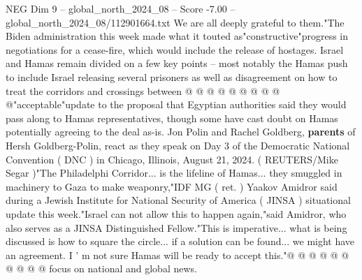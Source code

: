 \begin{textsample}{NEG Dim 9 – global\_north\_2024\_08 – Score -7.00 – global\_north\_2024\_08/112901664.txt}
We are all deeply grateful to them."The Biden administration this week made what it touted as"constructive"progress in negotiations for a cease-fire, which would include the release of hostages.
Israel and Hamas remain divided on a few key points -- most notably the Hamas push to include Israel releasing several prisoners as well as disagreement on how to treat the corridors and crossings between @ @ @ @ @ @ @ @ @ @"acceptable"update to the proposal that Egyptian authorities said they would pass along to Hamas representatives, though some have cast doubt on Hamas potentially agreeing to the deal as-is.
Jon Polin and Rachel Goldberg, \textbf{parents} of Hersh Goldberg-Polin, react as they speak on Day 3 of the Democratic National Convention ( DNC ) in Chicago, Illinois, August 21, 2024. ( REUTERS/Mike Segar )"The Philadelphi Corridor... is the lifeline of Hamas... they smuggled in machinery to Gaza to make weaponry,"IDF MG ( ret. ) Yaakov Amidror said during a Jewish Institute for National Security of America ( JINSA ) situational update this week."Israel can not allow this to happen again,"said Amidror, who also serves as a JINSA Distinguished Fellow."This is imperative... what is being discussed is how to square the circle... if a solution can be found... we might have an agreement.
I ' m not sure Hamas will be ready to accept this."@ @ @ @ @ @ @ @ @ @ focus on national and global news.

\end{textsample}
